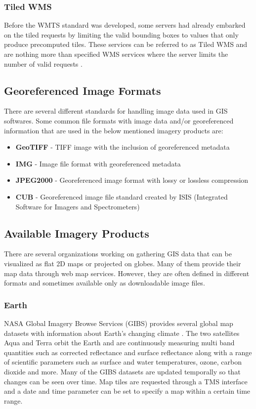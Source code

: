 \subsubsection{Tiled WMS}

Before the WMTS standard was developed, some servers had already embarked on the tiled requests by limiting the valid bounding boxes to values that only produce precomputed tiles. These services can be referred to as Tiled WMS and are nothing more than specified WMS services where the server limits the number of valid requests \cite{wmts10}.

\subsection{Georeferenced Image Formats}

There are several different standards for handling image data used in GIS softwares. Some common file formats with image data and/or georeferenced information that are used in the below mentioned imagery products are:

\begin{itemize}  
\item \textbf{GeoTIFF} - TIFF image with the inclusion of georeferenced metadata
\item \textbf{IMG} - Image file format with georeferenced metadata
\item \textbf{JPEG2000} - Georeferenced image format with lossy or lossless compression
\item \textbf{CUB} - Georeferenced image file standard created by ISIS (Integrated Software for Imagers and Spectrometers)
\end{itemize}

\subsection{Available Imagery Products}

There are several organizations working on gathering GIS data that can be visualized as flat 2D maps or projected on globes. Many of them provide their map data through web map services. However, they are often defined in different formats and sometimes available only as downloadable image files.

\subsubsection{Earth}

NASA Global Imagery Browse Services (GIBS) provides several global map datasets with information about Earth's changing climate \cite{gibs}. The two satellites Aqua and Terra orbit the Earth and are continuously measuring multi band quantities such as corrected reflectance and surface reflectance along with a range of scientific parameters such as surface and water temperatures, ozone, carbon dioxide and more. Many of the GIBS datasets are updated temporally so that changes can be seen over time. Map tiles are requested through a TMS interface and a date and time parameter can be set to specify a map within a certain time range.


